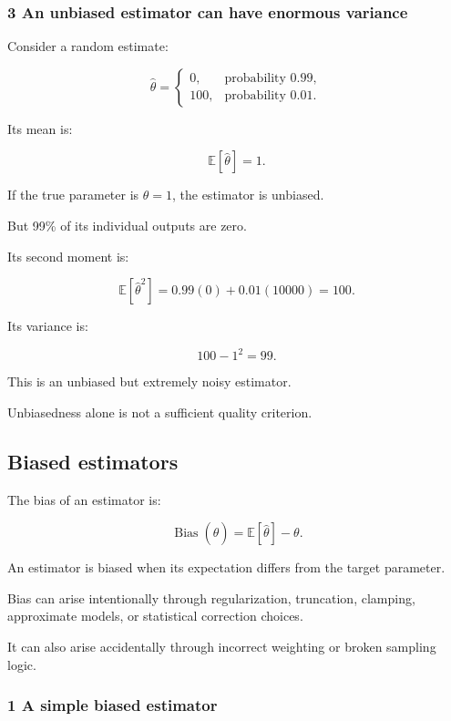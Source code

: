 \subsubsection{3 An unbiased estimator can have enormous variance}\label{02-foundations-ii-ch030-an-unbiased-estimator-can-have-enormous-variance}

Consider a random estimate:

\[
 \widehat\theta= \begin{cases} 0,&\text{probability }0.99,\\ 100,&\text{probability }0.01. \end{cases}
\]

Its mean is:

\[
 \mathbb E[\widehat\theta]=1.
\]

If the true parameter is \(\theta=1\), the estimator is unbiased.

But 99\% of its individual outputs are zero.

Its second moment is:

\[
 \mathbb E[\widehat\theta^2] = 0.99(0)+0.01(10000)=100.
\]

Its variance is:

\[
 100-1^2=\boxed{99}.
\]

This is an unbiased but extremely noisy estimator.

Unbiasedness alone is not a sufficient quality criterion.

\subsection{Biased estimators}\label{02-foundations-ii-ch030-biased-estimators}

The bias of an estimator is:

\[
 \boxed{ \operatorname{Bias}(\widehat\theta) = \mathbb E[\widehat\theta]-\theta }.
\]

An estimator is biased when its expectation differs from the target parameter.

Bias can arise intentionally through regularization, truncation, clamping, approximate models, or statistical correction choices.

It can also arise accidentally through incorrect weighting or broken sampling logic.

\subsubsection{1 A simple biased estimator}\label{02-foundations-ii-ch030-a-simple-biased-estimator}

